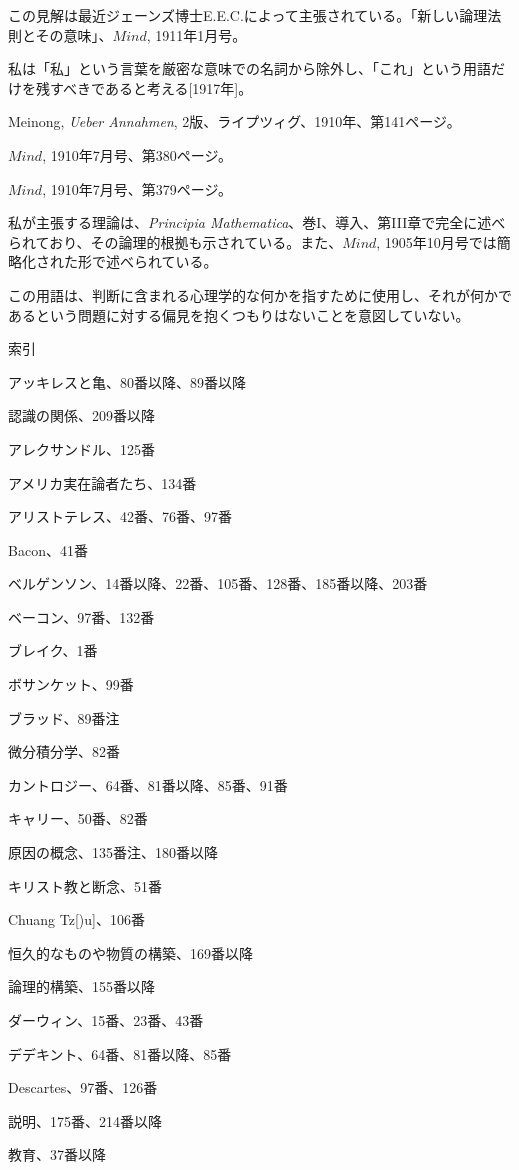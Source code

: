 \documentclass[a4paper,11pt,openany]{ltjsbook}
\begin{document}
 この見解は最近ジェーンズ博士E.E.C.によって主張されている。「新しい論理法則とその意味」、$Mind$, 1911年1月号。

 私は「私」という言葉を厳密な意味での名詞から除外し、「これ」という用語だけを残すべきであると考える[1917年]。

 Meinong, \textit{Ueber Annahmen}, 2版、ライプツィグ、1910年、第141ページ。

 $Mind$, 1910年7月号、第380ページ。

 $Mind$, 1910年7月号、第379ページ。

 私が主張する理論は、\textit{Principia Mathematica}、巻I、導入、第III章で完全に述べられており、その論理的根拠も示されている。また、$Mind$, 1905年10月号では簡略化された形で述べられている。

 この用語は、判断に含まれる心理学的な何かを指すために使用し、それが何かであるという問題に対する偏見を抱くつもりはないことを意図していない。

索引

アッキレスと亀、80番以降、89番以降

認識の関係、209番以降

アレクサンドル、125番

アメリカ実在論者たち、134番

アリストテレス、42番、76番、97番


 Bacon、41番

ベルゲンソン、14番以降、22番、105番、128番、185番以降、203番

ベーコン、97番、132番

ブレイク、1番

ボサンケット、99番

ブラッド、89番注


微分積分学、82番


カントロジー、64番、81番以降、85番、91番

キャリー、50番、82番

原因の概念、135番注、180番以降

キリスト教と断念、51番

 Chuang Tz[)u]、106番

恒久的なものや物質の構築、169番以降

論理的構築、155番以降


ダーウィン、15番、23番、43番

デデキント、64番、81番以降、85番

 Descartes、97番、126番

説明、175番、214番以降


教育、37番以降
\end{document}
